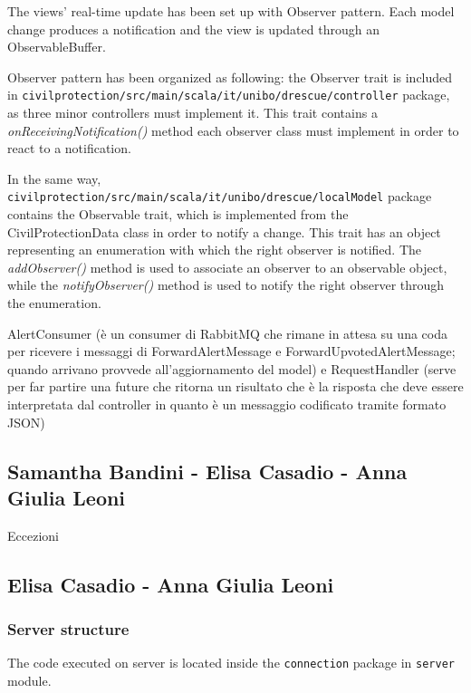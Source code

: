 \documentclass[a4paper,12pt]{report}
\begin{document}
The views' real-time update has been set up with Observer pattern. Each model change produces a notification and the view is updated through an ObservableBuffer.

Observer pattern has been organized as following: the Observer trait is included in \texttt{civilprotection/src/main/scala/it/unibo/drescue/controller} package, as three minor controllers must implement it. This trait contains a \textit{onReceivingNotification()} method each observer class must implement in order to react to a notification.

In the same way, \texttt{civilprotection/src/main/scala/it/unibo/drescue/localModel} package contains the Observable trait, which is implemented from the CivilProtectionData class in order to notify a change. This trait has an object representing an enumeration with which the right observer is notified. The \textit{addObserver()} method is used to associate an observer to an observable object, while the \textit{notifyObserver()} method is used to notify the right observer through the enumeration.

AlertConsumer (è un consumer di RabbitMQ che rimane in attesa su una coda per ricevere i messaggi di ForwardAlertMessage e ForwardUpvotedAlertMessage; quando arrivano provvede all'aggiornamento del model) e RequestHandler (serve per far partire una future che ritorna un risultato che è la risposta che deve essere interpretata dal controller in quanto è un messaggio codificato tramite formato JSON)

\subsection{Samantha Bandini - Elisa Casadio - Anna Giulia Leoni}
Eccezioni

\subsection{Elisa Casadio - Anna Giulia Leoni}
\subsubsection{Server structure}
The code executed on server is located inside the \texttt{connection} package in \texttt{server} module.
\end{document}
